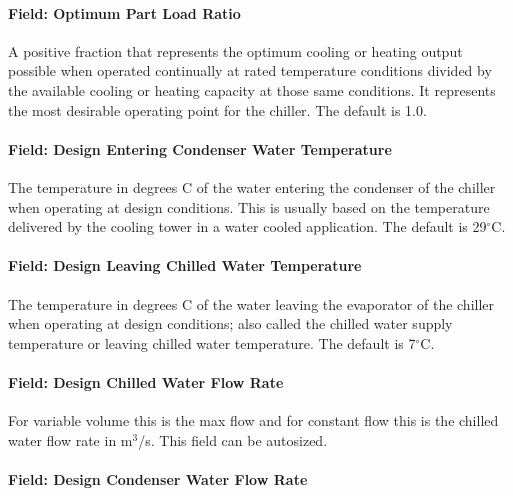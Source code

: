 \paragraph{Field: Optimum Part Load Ratio}\label{field-optimum-part-load-ratio-8}

A positive fraction that represents the optimum cooling or heating output possible when operated continually at rated temperature conditions divided by the available cooling or heating capacity at those same conditions. It represents the most desirable operating point for the chiller. The default is 1.0.

\paragraph{Field: Design Entering Condenser Water Temperature}\label{field-design-entering-condenser-water-temperature-1}

The temperature in degrees C of the water entering the condenser of the chiller when operating at design conditions. This is usually based on the temperature delivered by the cooling tower in a water cooled application. The default is 29$^\circ$C.

\paragraph{Field: Design Leaving Chilled Water Temperature}\label{field-design-leaving-chilled-water-temperature-1}

The temperature in degrees C of the water leaving the evaporator of the chiller when operating at design conditions; also called the chilled water supply temperature or leaving chilled water temperature. The default is 7$^\circ$C.

\paragraph{Field: Design Chilled Water Flow Rate}\label{field-design-chilled-water-flow-rate-7}

For variable volume this is the max flow and for constant flow this is the chilled water flow rate in m\(^{3}\)/s. This field can be autosized.

\paragraph{Field: Design Condenser Water Flow Rate}\label{field-design-condenser-water-flow-rate-6}

